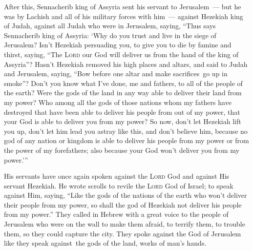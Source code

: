 \begin{inparaenum}
   After this, Sennacherib king of Assyria sent his servant to Jerusalem~--- but he was by Lachish and all of his military forces with him~--- against Hezekiah king of Judah, against all Judah who were in Jerusalem, saying,%
   ``Thus says Sennacherib king of Assyria: `Why do you trust and live in the siege of Jerusalem?%
   Isn't Hezekiah persuading you, to give you to die by famine and thirst, saying, ``The \textsc{Lord} our God will deliver us from the hand of the king of Assyria''?%
   Hasn't Hezekiah removed his high places and altars, and said to Judah and Jerusalem, saying, ``Bow before one altar and make sacrifices\understood\ go up in smoke''?%
   Don't you know what I've done, me and fathers, to all of the people of the earth? Were the gods of the land in any way able to deliver their land from my power?%
   Who among all the gods of those nations whom my fathers have destroyed that have been able to deliver his people from out of my power, that your God is able to deliver you from my power?%
   So now, don't let Hezekiah lift you up, don't let him lead you astray like this, and don't believe him, because no god of any nation or kingdom is able to deliver his people from my power or from the power of my forefathers; also because your God won't deliver you from my power.'\thinspace''%
  
   His servants have once again spoken against the \textsc{Lord} God and against His servant Hezekiah.%
   He wrote scrolls to revile the \textsc{Lord} God of Israel; to speak against Him, saying, ``Like the gods of the nations of the earth who won't deliver their people from my power, so shall the god of Hezekiah not deliver his people from my power.''%
   They called in Hebrew with a great voice to the people of Jerusalem who were on the wall to make them afraid, to terrify them, to trouble them, so they could capture the city.%
   They spoke against the God of Jerusalem like they speak against\understood\ the gods of the land, works of man's hands.%
  

\end{inparaenum}
